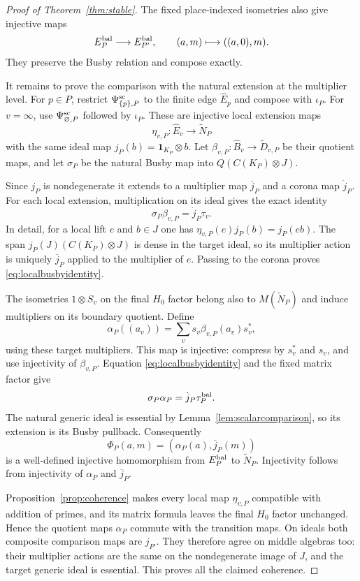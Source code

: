 \documentclass[11pt]{article}
\newcommand{\one}{\mathbf 1}
\theoremstyle{definition}
\theoremstyle{remark}
\begin{document}
\begin{proof}[Proof of Theorem~\ref{thm:stable}]
The fixed place-indexed isometries also give injective maps
\[
 E_P^{\rm bal}\longrightarrow E_{P'}^{\rm bal},
 \qquad(a,m)\longmapsto((a,0),m).
\]
They preserve the Busby relation and compose exactly.

It remains to prove the comparison with the natural extension at the multiplier level. For $p\in P$, restrict $\Psi^{\rm sc}_{\{p\},P}$ to the finite edge $\widehat E_p$ and compose with $\iota_P$. For $v=\infty$, use $\Psi^{\rm sc}_{\varnothing,P}$ followed by $\iota_P$. These are injective local extension maps
\[
 \eta_{v,P}:\widehat E_v\longrightarrow\widetilde N_P
\]
with the same ideal map $j_P(b)=\one_{K_P}\otimes b$. Let $\beta_{v,P}:\widehat B_v\to\widetilde D_{v,P}$ be their quotient maps, and let $\sigma_P$ be the natural Busby map into $Q(C(K_P)\otimes J)$.

Since $j_P$ is nondegenerate it extends to a multiplier map $\overline j_P$ and a corona map $\dot j_P$. For each local extension, multiplication on its ideal gives the exact identity
\begin{equation}\label{eq:localbusbyidentity}
 \sigma_P\beta_{v,P}=\dot j_P\tau_v.
\end{equation}
In detail, for a local lift $e$ and $b\in J$ one has $\eta_{v,P}(e)j_P(b)=j_P(eb)$. The span $j_P(J)(C(K_P)\otimes J)$ is dense in the target ideal, so its multiplier action is uniquely $\overline j_P$ applied to the multiplier of $e$. Passing to the corona proves \eqref{eq:localbusbyidentity}.

The isometries $1\otimes S_v$ on the final $H_0$ factor belong also to $M(\widetilde N_P)$ and induce multipliers on its boundary quotient. Define
\[
 \alpha_P((a_v))=\sum_v s_v\beta_{v,P}(a_v)s_v^*,
\]
using these target multipliers. This map is injective: compress by $s_v^*$ and $s_v$, and use injectivity of $\beta_{v,P}$. Equation \eqref{eq:localbusbyidentity} and the fixed matrix factor give
\begin{equation}\label{eq:globalbusbyidentity}
 \sigma_P\alpha_P=\dot j_P\tau_P^{\rm bal}.
\end{equation}
The natural generic ideal is essential by Lemma~\ref{lem:scalarcomparison}, so its extension is its Busby pullback. Consequently
\[
 \Phi_P(a,m)=(\alpha_P(a),\overline j_P(m))
\]
is a well-defined injective homomorphism from $E_P^{\rm bal}$ to $\widetilde N_P$. Injectivity follows from injectivity of $\alpha_P$ and $\overline j_P$.

Proposition~\ref{prop:coherence} makes every local map $\eta_{v,P}$ compatible with addition of primes, and its matrix formula leaves the final $H_0$ factor unchanged. Hence the quotient maps $\alpha_P$ commute with the transition maps. On ideals both composite comparison maps are $j_{P'}$. They therefore agree on middle algebras too: their multiplier actions are the same on the nondegenerate image of $J$, and the target generic ideal is essential. This proves all the claimed coherence.


\end{proof}
\end{document}
